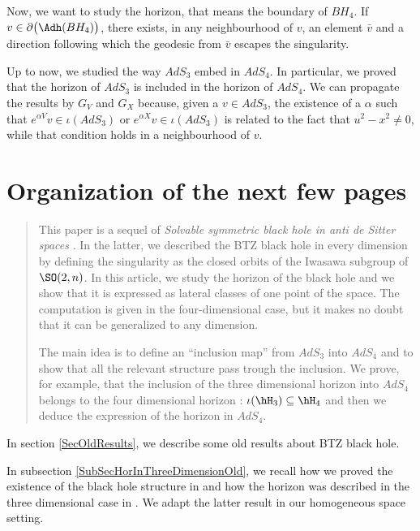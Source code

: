 Now, we want to study the horizon, that means the boundary of $BH_4$. If $v\in\partial\big(\Adh(BH_4) \big)$, there exists, in any neighbourhood of $v$, an element $\bar v$ and a direction following which the geodesic from $\bar v$ escapes the singularity.

Up to now, we studied the way $AdS_3$ embed in $AdS_4$. In particular, we proved that the horizon of $AdS_3$ is included in the horizon of $AdS_4$. We can propagate the results by $G_V$ and $G_X$ because, given a $v\in AdS_3$, the existence of a $\alpha$ such that $ e^{\alpha V}v\in\iota(AdS_3)$ or $ e^{\alpha X}v\in\iota(AdS_3)$ is related to the fact that $u^2-x^2\neq 0$, while that condition holds in a neighbourhood of $v$. 

\section{Organization of the next few pages}

\begin{abstract}
	This paper is a sequel of \emph{Solvable symmetric black hole in anti de Sitter spaces} \cite{lcTNAdS}. In the latter, we described the BTZ black hole in every dimension by defining the singularity as the closed orbits of the Iwasawa subgroup of $\SO(2,n)$. In this article, we study the horizon of the black hole and we show that it is expressed as lateral classes of one point of the space. The computation is given in the four-dimensional case, but it makes no doubt that it can be generalized to any dimension.

	The main idea is to define an ``inclusion map'' from $AdS_3$ into $AdS_4$ and to show that all the relevant structure pass trough the inclusion. We prove, for example, that the inclusion of the three dimensional horizon into $AdS_4$ belongs to the four dimensional horizon : $\iota(\hH_3)\subseteq\hH_4$ and then we deduce the expression of the horizon in $AdS_4$.
\end{abstract}

In section \ref{SecOldResults}, we describe some old results about BTZ black hole.

In subsection \ref{SubSecHorInThreeDimensionOld}, we recall how we proved the existence of the black hole structure in \cite{lcTNAdS} and how the horizon was described in the three dimensional case in \cite{Keio}. We adapt the latter result in our homogeneous space setting.


